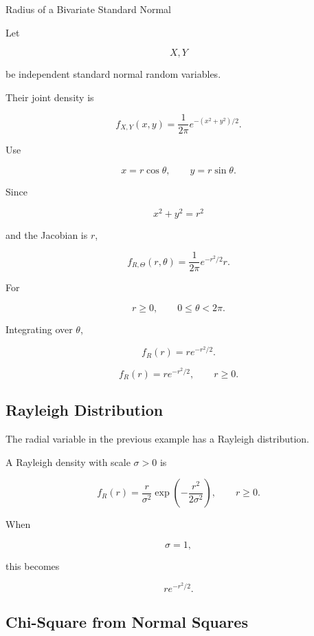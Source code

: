 \begin{workedexamplebox}{Radius of a Bivariate Standard Normal}

Let

\[
X,Y
\]

be independent standard normal random variables.

Their joint density is

\[
f_{X,Y}(x,y)
=
\frac1{2\pi}
e^{-(x^2+y^2)/2}.
\]

Use

\[
x=r\cos\theta,
\qquad
y=r\sin\theta.
\]

Since

\[
x^2+y^2=r^2
\]

and the Jacobian is \(r\),

\[
f_{R,\Theta}(r,\theta)
=
\frac1{2\pi}
e^{-r^2/2}r.
\]

For

\[
r\geq0,
\qquad
0\leq\theta<2\pi.
\]

Integrating over \(\theta\),

\[
f_R(r)
=
re^{-r^2/2}.
\]

\begin{answerbox}
\[
\boxed{
f_R(r)
=
re^{-r^2/2},
\qquad
r\geq0.
}
\]
\end{answerbox}

\end{workedexamplebox}

\subsection{Rayleigh Distribution}
\label{subsec:rayleigh-distribution}

The radial variable in the previous example has a Rayleigh
distribution.

A Rayleigh density with scale \(\sigma>0\) is

\[
\boxed{
f_R(r)
=
\frac{r}{\sigma^2}
\exp
\left(
-\frac{r^2}{2\sigma^2}
\right),
\qquad
r\geq0.
}
\]

When

\[
\sigma=1,
\]

this becomes

\[
re^{-r^2/2}.
\]

\subsection{Chi-Square from Normal Squares}
\label{subsec:chi-square-normal-squares}

